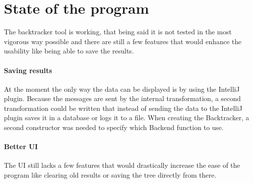 \section{State of the program}
\label{fbState}
The backtracker tool is working, that being said it is not tested in the most vigorous way possible and there are still a few features that would enhance the usability like being able to save the results.

\paragraph{Saving results}
At the moment the only way the data can be displayed is by using the IntelliJ plugin. Because the messages are sent by the internal transformation, a second transformation could be written that instead of sending the data to the IntelliJ plugin saves it in a database or logs it to a file. When creating the Backtracker, a second constructor was needed to specify which Backend function to use.

\paragraph{Better UI}
The UI still lacks a few features that would drastically increase the ease of the program like clearing old results or saving the tree directly from there.
